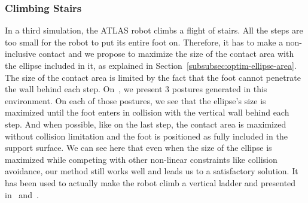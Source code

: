 \subsubsection{Climbing Stairs}
\label{subsubsec:smallStairs}


In a third simulation, the ATLAS robot climbs a flight of stairs.
All the steps are too small for the robot to put its entire foot on.
Therefore, it has to make a non-inclusive contact and we propose to maximize the size of the contact area with the ellipse included in it, as explained in Section~\ref{subsubsec:optim-ellipse-area}.
The size of the contact area is limited by the fact that the foot cannot penetrate the wall behind each step.
On~, we present 3 postures generated in this environment.
On each of those postures, we see that the ellipse's size is maximized until the foot enters in collision with the vertical wall behind each step.
And when possible, like on the last step, the contact area is maximized without collision limitation and the foot is positioned as fully included in the support surface.
We can see here that even when the size of the ellipse is maximized while competing with other non-linear constraints like collision avoidance, our method still works well and leads us to a satisfactory solution.
It has been used to actually make the robot climb a vertical ladder and presented in~\cite{vaillant:autonomousrobots:2016} and~\cite{vaillant:humanoids:2014}.


